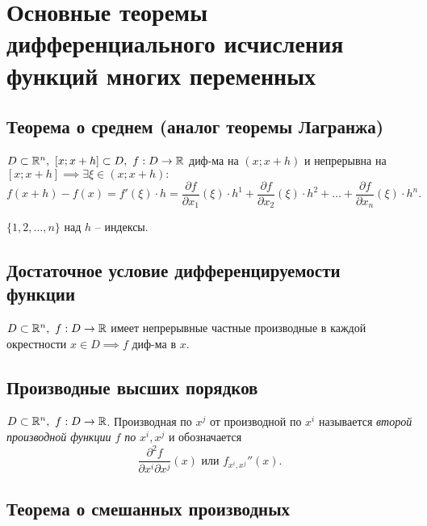 \section{Основные теоремы дифференциального исчисления функций многих переменных}

\setcounter{subsection}{2}

\subsection{Теорема о среднем (аналог теоремы Лагранжа)}

\begin{theorem}
    $ D \subset \mathbb{R}^n, \ [x;x+h]\subset D, \ f: D \rightarrow\mathbb{R} $ диф-ма на $ (x;x+h) $ и непрерывна на $ [x;x+h] \implies \exists \xi \in (x;x+h): $
    \[
        f(x+h)-f(x) = f'(\xi)\cdot h = \frac{\partial f}{\partial x_1}(\xi)\cdot h^1 + \frac{\partial f}{\partial x_2}(\xi)\cdot h^2 + \ldots + \frac{\partial f}{\partial x_n}(\xi)\cdot h^n.
    \]
\end{theorem}

\begin{note}
    $ \{1,2,\ldots,n\} $ над $ h $ -- индексы.
\end{note}

\subsection{Достаточное условие дифференцируемости функции}

\begin{theorem}
    $ D \subset \mathbb{R}^n, \ f:D \rightarrow\mathbb{R} $ имеет непрерывные частные производные в каждой окрестности $ x \in D \implies f $ диф-ма в $ x $.
\end{theorem}

\newpage

\subsection{Производные высших порядков}

\begin{definition}
    $ D \subset \mathbb{R}^n, \ f:D \rightarrow\mathbb{R} $. Производная по $ x^j $ от производной по $ x^i $ называется \emph{второй производной функции $ f $ по} $ x^i,x^j $ и обозначается
    \[
        \frac{\partial^2f}{\partial x^i\partial x^j}(x)\text{ или }f_{x^i,x^j}''(x).
    \]
\end{definition}

\subsection{Теорема о смешанных производных}

